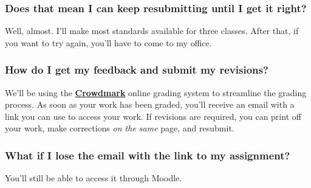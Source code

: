 \documentclass[10pt,]{article}
\newcommand{\terminology}[1]{\textbf{#1}}
\begin{document}
\subsubsection[{Does that mean I can keep resubmitting until I get it right?}]{Does that mean I can keep resubmitting until I get it right?}\label{subsubsection-19}
\hypertarget{p-27}{}%
Well, almost. I'll make most standards available for three classes. After that, if you want to try again, you'll have to come to my office.%
%
%
\typeout{************************************************}
\typeout{************************************************}
%
\subsubsection[{How do I get my feedback and submit my revisions?}]{How do I get my feedback and submit my revisions?}\label{subsubsection-20}
\hypertarget{p-28}{}%
We'll be using the \href{https://crowdmark.com/}{\terminology{Crowdmark}} online grading system to streamline the grading process. As soon as your work has been graded, you'll receive an email with a link you can use to access your work. If revisions are required, you can print off your work, make corrections \emph{on the same} page, and resubmit.%
%
%
\typeout{************************************************}
\typeout{************************************************}
%
\subsubsection[{What if I lose the email with the link to my assignment?}]{What if I lose the email with the link to my assignment?}\label{subsubsection-21}
\hypertarget{p-29}{}%
You'll still be able to access it through Moodle.%
%
%
\typeout{************************************************}
\typeout{************************************************}
%
\end{document}
